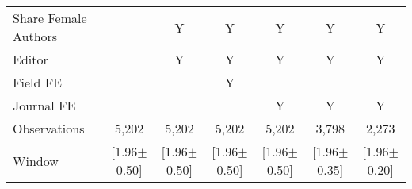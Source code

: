 \begin{tabular}{l*{6}{c}}
Share Female Authors &         &        Y&        Y&        Y&        Y&        Y\\
Editor          &         &        Y&        Y&        Y&        Y&        Y\\
Field FE        &         &         &        Y&         &         &         \\
Journal FE      &         &         &         &        Y&        Y&        Y\\
\hline
Observations    &    5,202&    5,202&    5,202&    5,202&    3,798&    2,273\\
Window          &[1.96$\pm$0.50]&[1.96$\pm$0.50]&[1.96$\pm$0.50]&[1.96$\pm$0.50]&[1.96$\pm$0.35]&[1.96$\pm$0.20]\\
\hline\hline
\end{tabular}
